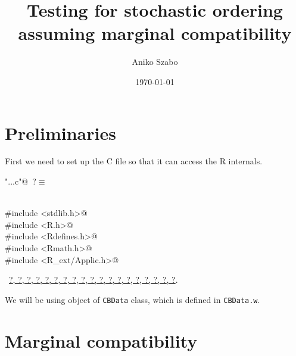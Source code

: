 \documentclass[reqno]{amsart}
\title{Testing for stochastic ordering assuming marginal compatibility}
\author{Aniko Szabo}
\date{\today}
\renewcommand{\NWtarget}[2]{\hypertarget{#1}{#2}}
\renewcommand{\NWlink}[2]{\hyperlink{#1}{#2}}
\begin{document}
\maketitle


\section{Preliminaries}

First we need to set up the C file so that it can access the R internals.
\begin{flushleft} \small
\begin{minipage}{\linewidth}\label{scrap1}\raggedright\small
\NWtarget{nuweb?}{} \verb@"..\src\ReprodCalcs.c"@\nobreak\ {\footnotesize {?}}$\equiv$
\vspace{-1ex}
\begin{list}{}{} \item
\mbox{}\verb@@\\
\mbox{}\verb@#include <stdlib.h>@\\
\mbox{}\verb@#include <R.h>@\\
\mbox{}\verb@#include <Rdefines.h>@\\
\mbox{}\verb@#include <Rmath.h>@\\
\mbox{}\verb@#include <R_ext/Applic.h>@\\
\mbox{}\verb@@{\NWsep}
\end{list}
\vspace{-1.5ex}
\footnotesize
\begin{list}{}{\setlength{\itemsep}{-\parsep}\setlength{\itemindent}{-\leftmargin}}
\item \NWtxtFileDefBy\ \NWlink{nuweb?}{?}\NWlink{nuweb?}{, ?}\NWlink{nuweb?}{, ?}\NWlink{nuweb?}{, ?}\NWlink{nuweb?}{, ?}\NWlink{nuweb?}{, ?}\NWlink{nuweb?}{, ?}\NWlink{nuweb?}{, ?}\NWlink{nuweb?}{, ?}\NWlink{nuweb?}{, ?}\NWlink{nuweb?}{, ?}\NWlink{nuweb?}{, ?}\NWlink{nuweb?}{, ?}\NWlink{nuweb?}{, ?}\NWlink{nuweb?}{, ?}\NWlink{nuweb?}{, ?}\NWlink{nuweb?}{, ?}\NWlink{nuweb?}{, ?}\NWlink{nuweb?}{, ?}.

\item{}
\end{list}
\end{minipage}\vspace{4ex}
\end{flushleft}
We will be using object of \texttt{CBData} class, which is defined in \texttt{CBData.w}.


\section{Marginal compatibility}
\end{document}
